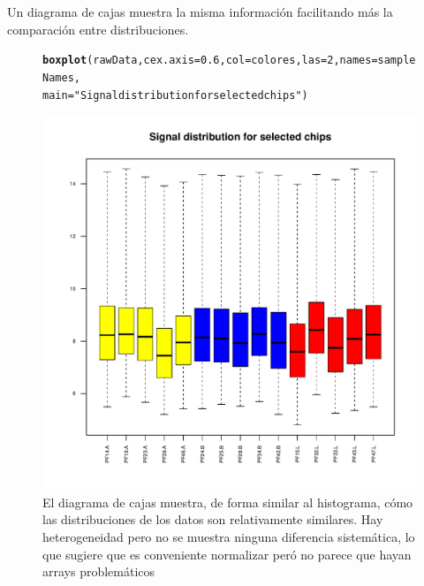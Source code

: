 \documentclass[a4paper]{article}\usepackage[]{graphicx}\usepackage[]{color}
\makeatletter
\def\maxwidth{ %
  \ifdim\Gin@nat@width>\linewidth
    \linewidth
  \else
    \Gin@nat@width
  \fi
}
\newcommand{\hlnum}[1]{\textcolor[rgb]{0.686,0.059,0.569}{#1}}%
\newcommand{\hlstr}[1]{\textcolor[rgb]{0.192,0.494,0.8}{#1}}%
\newcommand{\hlstd}[1]{\textcolor[rgb]{0.345,0.345,0.345}{#1}}%
\newcommand{\hlkwc}[1]{\textcolor[rgb]{0.333,0.667,0.333}{#1}}%
\newcommand{\hlkwd}[1]{\textcolor[rgb]{0.737,0.353,0.396}{\textbf{#1}}}%
\newenvironment{kframe}{%
 \def\at@end@of@kframe{}%
 \ifinner\ifhmode%
  \def\at@end@of@kframe{\end{minipage}}%
  \begin{minipage}{\columnwidth}%
 \fi\fi%
 \def\FrameCommand##1{\hskip\@totalleftmargin \hskip-\fboxsep
 \colorbox{shadecolor}{##1}\hskip-\fboxsep
     \hskip-\linewidth \hskip-\@totalleftmargin \hskip\columnwidth}%
 \MakeFramed {\advance\hsize-\width
   \@totalleftmargin\z@ \linewidth\hsize
   \@setminipage}}%
 {\par\unskip\endMakeFramed%
 \at@end@of@kframe}
\newenvironment{knitrout}{}{} %
\makeatother
\begin{document}
Un diagrama de cajas muestra la misma información facilitando más la comparación entre distribuciones.
  
\begin{figure}[htbp]
\centering
\begin{knitrout}
\color{fgcolor}\begin{kframe}
\begin{alltt}
\hlkwd{boxplot}\hlstd{(rawData,} \hlkwc{cex.axis}\hlstd{=}\hlnum{0.6}\hlstd{,} \hlkwc{col}\hlstd{=colores,} \hlkwc{las}\hlstd{=}\hlnum{2}\hlstd{,} \hlkwc{names}\hlstd{=sampleNames,}
        \hlkwc{main}\hlstd{=}\hlstr{"Signal distribution for selected chips"}\hlstd{)}
\end{alltt}
\end{kframe}
\includegraphics[width=\maxwidth]{images/graficboxplot-1} 

\end{knitrout}
  \caption{El diagrama de cajas muestra, de forma similar al histograma, cómo las distribuciones de los datos son relativamente similares. Hay heterogeneidad pero no se muestra ninguna diferencia sistemática, lo que sugiere que es conveniente normalizar peró no parece que hayan arrays problemáticos}
  \label{fig:boxplot}
\end{figure}
\end{document}
